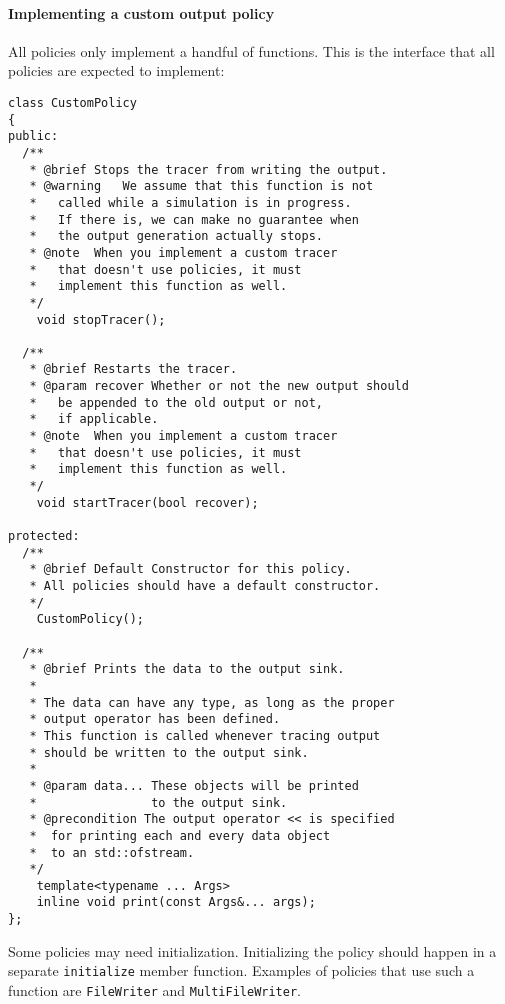 \paragraph{Implementing a custom output policy}
All policies only implement a handful of functions. This is the interface that all policies are expected to implement:
\begin{lstlisting}
class CustomPolicy
{
public:
  /**
   * @brief Stops the tracer from writing the output.
   * @warning	We assume that this function is not
   *   called while a simulation is in progress.
   *   If there is, we can make no guarantee when
   *   the output generation actually stops.
   * @note  When you implement a custom tracer
   *   that doesn't use policies, it must
   *   implement this function as well.
   */
	void stopTracer();

  /**
   * @brief Restarts the tracer.
   * @param recover Whether or not the new output should
   *   be appended to the old output or not,
   *   if applicable.
   * @note  When you implement a custom tracer
   *   that doesn't use policies, it must
   *   implement this function as well.
   */
	void startTracer(bool recover);
	
protected:
  /**
   * @brief Default Constructor for this policy.
   * All policies should have a default constructor.
   */
	CustomPolicy();

  /**
   * @brief Prints the data to the output sink.
   *
   * The data can have any type, as long as the proper
   * output operator has been defined.
   * This function is called whenever tracing output
   * should be written to the output sink.
   *
   * @param data... These objects will be printed
   *                to the output sink.
   * @precondition The output operator << is specified
   *  for printing each and every data object
   *  to an std::ofstream.
   */
	template<typename ... Args>
	inline void print(const Args&... args);
};
\end{lstlisting}
Some policies may need initialization. Initializing the policy should happen in a separate \lstinline{initialize} member function. Examples of policies that use such a function are \lstinline{FileWriter} and \lstinline{MultiFileWriter}.